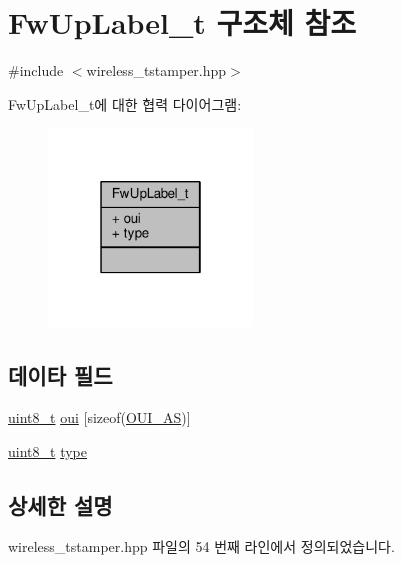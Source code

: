 \hypertarget{struct_fw_up_label__t}{}\section{Fw\+Up\+Label\+\_\+t 구조체 참조}
\label{struct_fw_up_label__t}


{\ttfamily \#include $<$wireless\+\_\+tstamper.\+hpp$>$}



Fw\+Up\+Label\+\_\+t에 대한 협력 다이어그램\+:
\nopagebreak
\begin{figure}[H]
\begin{center}
\leavevmode
\includegraphics[width=154pt]{struct_fw_up_label__t__coll__graph}
\end{center}
\end{figure}
\subsection*{데이타 필드}
\begin{DoxyCompactItemize}
\item 
\hyperlink{stdint_8h_aba7bc1797add20fe3efdf37ced1182c5}{uint8\+\_\+t} \hyperlink{struct_fw_up_label__t_aa08bc131fa0b9ae9116d216683615790}{oui} \mbox{[}sizeof(\hyperlink{wireless__tstamper_8hpp_a95adc203e11671fd8bcd47de1fca5215}{O\+U\+I\+\_\+AS})\mbox{]}
\item 
\hyperlink{stdint_8h_aba7bc1797add20fe3efdf37ced1182c5}{uint8\+\_\+t} \hyperlink{struct_fw_up_label__t_a1d127017fb298b889f4ba24752d08b8e}{type}
\end{DoxyCompactItemize}


\subsection{상세한 설명}


wireless\+\_\+tstamper.\+hpp 파일의 54 번째 라인에서 정의되었습니다.



